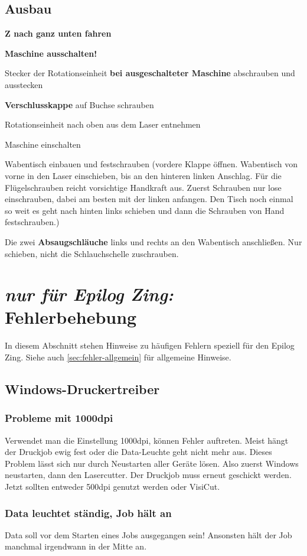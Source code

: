 \documentclass{\basedir/fablab-document}
\newcommand{\nurZing}{\emph{nur für Epilog Zing:} }
\begin{document}
	\subsection{Ausbau}
	\textbf{Z nach ganz unten fahren}

	\textbf{Maschine ausschalten!}

	Stecker der Rotationseinheit \textbf{bei ausgeschalteter Maschine} abschrauben und ausstecken

	\textbf{Verschlusskappe} auf Buchse schrauben

	Rotationseinheit nach oben aus dem Laser entnehmen

	Maschine einschalten

	Wabentisch einbauen und festschrauben (vordere Klappe öffnen. Wabentisch von vorne in den Laser einschieben, bis an den hinteren linken Anschlag. Für die Flügelschrauben reicht vorsichtige Handkraft aus. Zuerst Schrauben nur lose einschrauben, dabei am besten mit der linken anfangen. Den Tisch noch einmal so weit es geht nach hinten links schieben und dann die Schrauben von Hand festschrauben.)

	 Die zwei \textbf{Absaugschläuche} links und rechts an den Wabentisch anschließen. Nur schieben, nicht die Schlauchschelle zuschrauben.

	\section{\nurZing Fehlerbehebung}
	In diesem Abschnitt stehen Hinweise zu häufigen Fehlern speziell für den Epilog Zing. Siehe auch \cref{sec:fehler-allgemein} für allgemeine Hinweise.

	\subsection{Windows-Druckertreiber}
	\subsubsection{Probleme mit 1000dpi}
	Verwendet man die Einstellung 1000dpi, können Fehler auftreten. Meist hängt der Druckjob ewig fest oder die Data-Leuchte geht nicht mehr aus. Dieses Problem lässt sich nur durch Neustarten aller Geräte lösen. Also zuerst Windows neustarten, dann den Lasercutter. Der Druckjob muss erneut geschickt werden. Jetzt sollten entweder 500dpi genutzt werden oder VisiCut.

	\subsubsection{Data leuchtet ständig, Job hält an}
	Data soll vor dem Starten eines Jobs ausgegangen sein! Ansonsten hält der Job manchmal irgendwann in der Mitte an.
\end{document}
